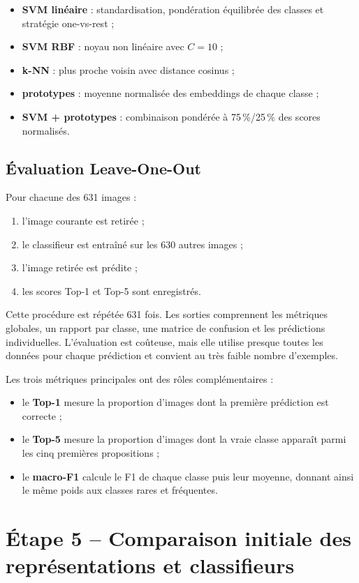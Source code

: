 \documentclass[12pt,a4paper]{report}
\newcommand{\pct}[1]{\num{#1}\,\%}
\begin{document}
\begin{itemize}
  \item \textbf{SVM linéaire} : standardisation, pondération équilibrée des classes et stratégie one-vs-rest ;
  \item \textbf{SVM RBF} : noyau non linéaire avec $C=10$ ;
  \item \textbf{k-NN} : plus proche voisin avec distance cosinus ;
  \item \textbf{prototypes} : moyenne normalisée des embeddings de chaque classe ;
  \item \textbf{SVM + prototypes} : combinaison pondérée à \pct{75}/\pct{25} des scores normalisés.
\end{itemize}

\section{Évaluation Leave-One-Out}

Pour chacune des 631 images :
\begin{enumerate}
  \item l'image courante est retirée ;
  \item le classifieur est entraîné sur les 630 autres images ;
  \item l'image retirée est prédite ;
  \item les scores Top-1 et Top-5 sont enregistrés.
\end{enumerate}

Cette procédure est répétée 631 fois. Les sorties comprennent les métriques globales, un rapport par classe, une matrice de confusion et les prédictions individuelles. L'évaluation est coûteuse, mais elle utilise presque toutes les données pour chaque prédiction et convient au très faible nombre d'exemples.

Les trois métriques principales ont des rôles complémentaires :
\begin{itemize}
  \item le \textbf{Top-1} mesure la proportion d'images dont la première prédiction est correcte ;
  \item le \textbf{Top-5} mesure la proportion d'images dont la vraie classe apparaît parmi les cinq premières propositions ;
  \item le \textbf{macro-F1} calcule le F1 de chaque classe puis leur moyenne, donnant ainsi le même poids aux classes rares et fréquentes.
\end{itemize}

\chapter{Étape 5 -- Comparaison initiale des représentations et classifieurs}
\end{document}
